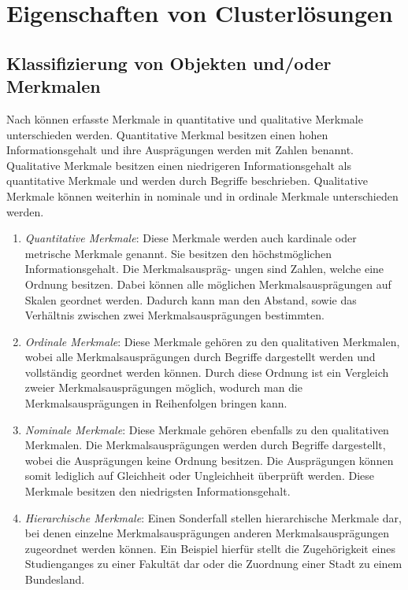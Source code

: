 \chapter{Eigenschaften von Clusterlösungen}

\section{Klassifizierung von Objekten und/oder Merkmalen}
Nach \citet[S. 158-163]{Bankhofer.2008} können erfasste Merkmale in quantitative und qualitative Merkmale unterschieden werden.
Quantitative Merkmal besitzen einen hohen Informationsgehalt und ihre Ausprägungen werden mit Zahlen benannt. Qualitative Merkmale besitzen einen niedrigeren Informationsgehalt als quantitative Merkmale und werden durch Begriffe beschrieben. Qualitative Merkmale können weiterhin in nominale und in ordinale Merkmale unterschieden werden.

\begin{enumerate}
	\item \textit{Quantitative Merkmale}: Diese Merkmale werden auch kardinale oder metrische Merkmale genannt. Sie besitzen den höchstmöglichen Informationsgehalt. Die Merkmalsauspräg- \linebreak ungen sind Zahlen, welche eine Ordnung besitzen. Dabei können alle möglichen Merkmalsausprägungen auf Skalen geordnet werden. Dadurch kann man den Abstand, sowie das Verhältnis zwischen zwei Merkmalsausprägungen bestimmten.
	\item \textit{Ordinale Merkmale}: Diese Merkmale gehören zu den qualitativen Merkmalen, wobei alle Merkmalsausprägungen durch Begriffe dargestellt werden und vollständig geordnet werden können. Durch diese Ordnung ist ein Vergleich zweier Merkmalsausprägungen möglich, wodurch man die Merkmalsausprägungen in Reihenfolgen bringen kann.
	\item \textit{Nominale Merkmale}: Diese Merkmale gehören ebenfalls zu den qualitativen Merkmalen. Die Merkmalsausprägungen werden durch Begriffe dargestellt, wobei die Ausprägungen keine Ordnung besitzen. Die Ausprägungen können somit lediglich auf Gleichheit oder Ungleichheit überprüft werden. Diese Merkmale besitzen den niedrigsten Informationsgehalt.
	\item \textit{Hierarchische Merkmale}: Einen Sonderfall stellen hierarchische Merkmale dar, bei denen einzelne Merkmalsausprägungen anderen Merkmalsausprägungen zugeordnet werden können. Ein Beispiel hierfür stellt die Zugehörigkeit eines Studienganges zu einer Fakultät dar oder die Zuordnung einer Stadt zu einem Bundesland.
\end{enumerate}

